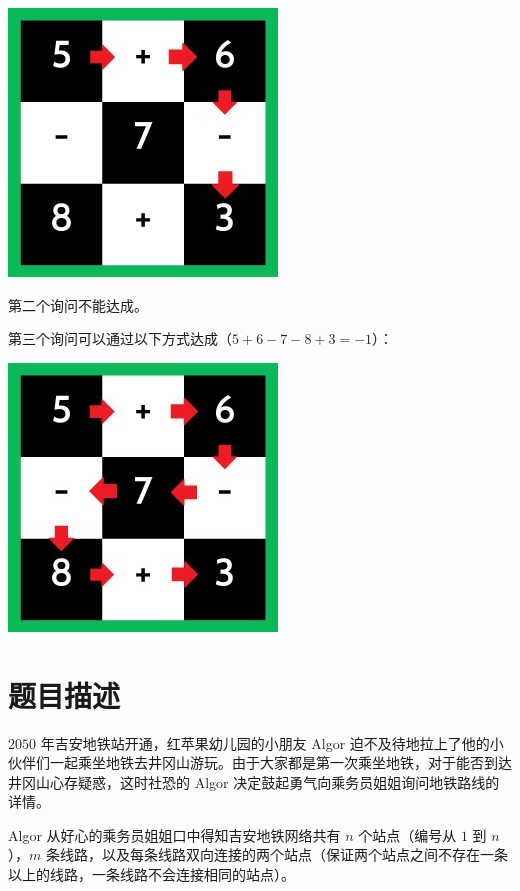 \documentclass{../cpct/ctpro}
\begin{document}
\begin{center}
    \includegraphics{images/quento4.jpg}
\end{center}

第二个询问不能达成。

第三个询问可以通过以下方式达成（$5+6-7-8+3=-1$）：

\begin{center}
    \includegraphics{images/quento5.jpg}
\end{center}

\makeproblem
\section*{题目描述}

$2050$ 年吉安地铁站开通，红苹果幼儿园的小朋友 Algor 迫不及待地拉上了他的小伙伴们一起乘坐地铁去井冈山游玩。由于大家都是第一次乘坐地铁，对于能否到达井冈山心存疑惑，这时社恐的 Algor 决定鼓起勇气向乘务员姐姐询问地铁路线的详情。

Algor 从好心的乘务员姐姐口中得知吉安地铁网络共有 $n$ 个站点（编号从 $1$ 到 $n$），$m$ 条线路，以及每条线路双向连接的两个站点（保证两个站点之间不存在一条以上的线路，一条线路不会连接相同的站点）。
\end{document}
